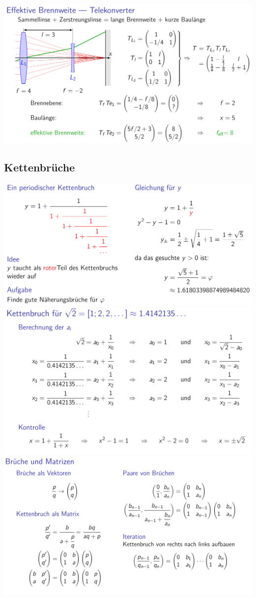 		 \includegraphics[width=0.8\linewidth]{Bilder/matrixoptik6} \\

	\subsection{Kettenbrüche}
		 \includegraphics[width=0.8\linewidth]{Bilder/kettenbruch1} \\
		 
		 \includegraphics[width=0.8\linewidth]{Bilder/kettenbruch2} \\
		 
		 \includegraphics[width=0.8\linewidth]{Bilder/kettenbruch3} \\
		 

